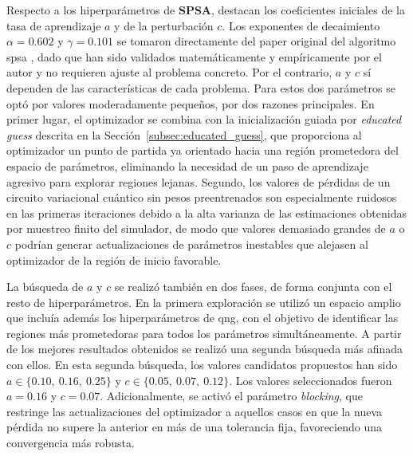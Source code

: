 Respecto a los hiperparámetros de \textbf{SPSA}, destacan los coeficientes iniciales de la tasa de aprendizaje $a$ y de la perturbación $c$. Los exponentes de decaimiento $\alpha = 0.602$ y $\gamma = 0.101$ se tomaron directamente del paper original del algoritmo \gls{spsa} \cite{spall_spsa_1998}, dado que han sido validados matemáticamente y empíricamente por el autor y no requieren ajuste al problema concreto. Por el contrario, $a$ y $c$ sí dependen de las características de cada problema. Para estos dos parámetros se optó por valores moderadamente pequeños, por dos razones principales. En primer lugar, el optimizador se combina con la inicialización guiada por \textit{educated guess} descrita en la Sección~\ref{subsec:educated_guess}, que proporciona al optimizador un punto de partida ya orientado hacia una región prometedora del espacio de parámetros, eliminando la necesidad de un paso de aprendizaje agresivo para explorar regiones lejanas. Segundo, los valores de pérdidas de un circuito variacional cuántico sin pesos preentrenados son especialmente ruidosos en las primeras iteraciones debido a la alta varianza de las estimaciones obtenidas por muestreo finito del simulador, de modo que valores demasiado grandes de $a$ o $c$ podrían generar actualizaciones de parámetros inestables que alejasen al optimizador de la región de inicio favorable.

La búsqueda de $a$ y $c$ se realizó también en dos fases, de forma conjunta con el resto de hiperparámetros. En la primera exploración se utilizó un espacio amplio que incluía además los hiperparámetros de \gls{qng}, con el objetivo de identificar las regiones más prometedoras para todos los parámetros simultáneamente. A partir de los mejores resultados obtenidos se realizó una segunda búsqueda más afinada con ellos. En esta segunda búsqueda, los valores candidatos propuestos han sido $a \in \{0.10,\ 0.16,\ 0.25\}$ y $c \in \{0.05,\ 0.07,\ 0.12\}$. Los valores seleccionados fueron $a = 0.16$ y $c = 0.07$. Adicionalmente, se activó el parámetro \textit{blocking}, que restringe las actualizaciones del optimizador a aquellos casos en que la nueva pérdida no supere la anterior en más de una tolerancia fija, favoreciendo una convergencia más robusta.

